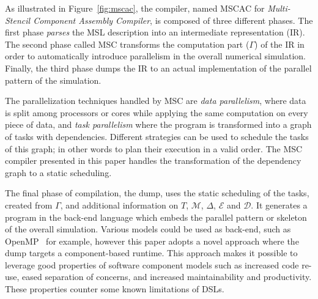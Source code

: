 As illustrated in Figure~\ref{fig:mscac}, the compiler, named MSCAC for \emph{Multi-Stencil Component Assembly Compiler}, is composed of three different phases. The first phase \emph{parses} the MSL description into an intermediate representation (IR). The second phase called MSC transforms the computation part ($\Gamma$) of the IR in order to automatically introduce parallelism in the overall numerical simulation.
Finally, the third phase dumps the IR to an actual implementation of the parallel pattern of the simulation.


The parallelization techniques handled by MSC are \emph{data parallelism}, where data is split among processors or cores while applying the same computation on every piece of data, and \emph{task parallelism} where the program is transformed into a graph of tasks with dependencies.
Different strategies can be used to schedule the tasks of this graph; in other words to plan their execution in a valid order. The MSC compiler presented in this paper handles the transformation of the dependency graph to a static scheduling.

The final phase of compilation, the dump, uses the static scheduling of the tasks, created from $\Gamma$, and additional information on $T$, $\mathcal{M}$, $\Delta$, $\mathcal{E}$ and $\mathcal{D}$.
It generates a program in the back-end language which embeds the parallel pattern or skeleton of the overall simulation.
Various models could be used as back-end, such as OpenMP~\cite{660313} for example, however this paper adopts a novel approach where the dump targets a component-based runtime.
This approach makes it possible to leverage good properties of software component models such as increased code re-use, eased separation of concerns, and increased maintainability and productivity.
These properties counter some known limitations of DSLs. %

